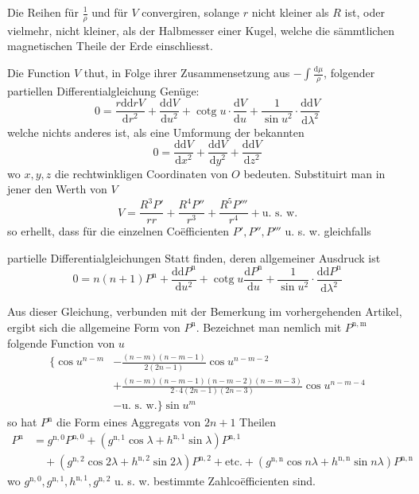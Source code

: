 Die Reihen für $\frac1\rho$ und für $V$ convergiren, solange $r$ nicht kleiner als $R$ ist, oder vielmehr, nicht kleiner, als der Halbmesser einer Kugel, welche die sämmtlichen magnetischen Theile der Erde einschliesst.

Die Function $V$ thut, in Folge ihrer Zusammensetzung aus $-\int\frac{\mathrm{d}\mu}{\rho}$, folgender partiellen Differentialgleichung Genüge:
\[
0=\frac{r\mathrm{d}\mathrm{d}rV}{\mathrm{d}r^2}+\frac{\mathrm{d}\mathrm{d}V}{\mathrm{d}u^2}+\operatorname{cotg}u\cdot\frac{\mathrm{d}V}{\mathrm{d}u}+\frac1{\sin u^2}\cdot\frac{\mathrm{d}\mathrm{d}V}{\mathrm{d}\lambda^2}
\]
welche nichts anderes ist, als eine Umformung der bekannten
\[
0=\frac{\mathrm{d}\mathrm{d}V}{\mathrm{d}x^2}+\frac{\mathrm{d}\mathrm{d}V}{\mathrm{d}y^2}+\frac{\mathrm{d}\mathrm{d}V}{\mathrm{d}z^2}
\]
wo $x,y,z$ die rechtwinkligen Coordinaten von $O$ bedeuten. Substituirt man in jener den Werth von $V$
\[
V=\frac{R^3P'}{rr}+\frac{R^4P''}{r^3}+\frac{R^5P'''}{r^4}+\text{u. s. w.}
\]
so erhellt, dass für die einzelnen Coëfficienten $P',P'',P'''$ u. s. w. gleichfalls\par\clearpage
{}
\noindent partielle Differentialgleichungen Statt finden, deren allgemeiner Ausdruck ist
\[
0=n(n+1)P^{\mathrm{n}}+\frac{\mathrm{d}\mathrm{d}P^{\mathrm{n}}}{\mathrm{d}u^2}+\operatorname{cotg}u\frac{\mathrm{d}P^{\mathrm{n}}}{\mathrm{d}u}+\frac1{\sin u^2}\cdot\frac{\mathrm{d}\mathrm{d}P^{\mathrm{n}}}{\mathrm{d}\lambda^2}
\]

Aus dieser Gleichung, verbunden mit der Bemerkung im vorhergehenden Artikel, ergibt sich die allgemeine Form von $P^{\mathrm{n}}$. Bezeichnet man nemlich mit $P^{\mathrm{n,m}}$ folgende Function von $u$
\[
\begin{aligned}
\{\cos u^{n-m}&-\frac{(n-m)(n-m-1)}{2(2n-1)}\cos u^{n-m-2}\\
&+\frac{(n-m)(n-m-1)(n-m-2)(n-m-3)}{2\cdot4(2n-1)(2n-3)}\cos u^{n-m-4}\\&-\text{u. s. w.}\}\sin u^m
\end{aligned}
\]
so hat $P^{\mathrm{n}}$ die Form eines Aggregats von $2n+1$ Theilen
\[
\begin{aligned}
P^{\mathrm{n}}&=g^{\mathrm{n,0}}P^{\mathrm{n,0}}+(g^{\mathrm{n,1}}\cos\lambda+h^{\mathrm{n,1}}\sin\lambda)P^{\mathrm{n,1}}\\
&\quad+(g^{\mathrm{n,2}}\cos2\lambda+h^{\mathrm{n,2}}\sin2\lambda)P^{\mathrm{n,2}}+\text{etc.}+(g^{\mathrm{n,n}}\cos n\lambda+h^{\mathrm{n,n}}\sin n\lambda)P^{\mathrm{n,n}}
\end{aligned}
\]
wo $g^{\mathrm{n,0}},g^{\mathrm{n,1}},h^{\mathrm{n,1}},g^{\mathrm{n,2}}$ u. s. w. bestimmte Zahlcoëfficienten sind.

